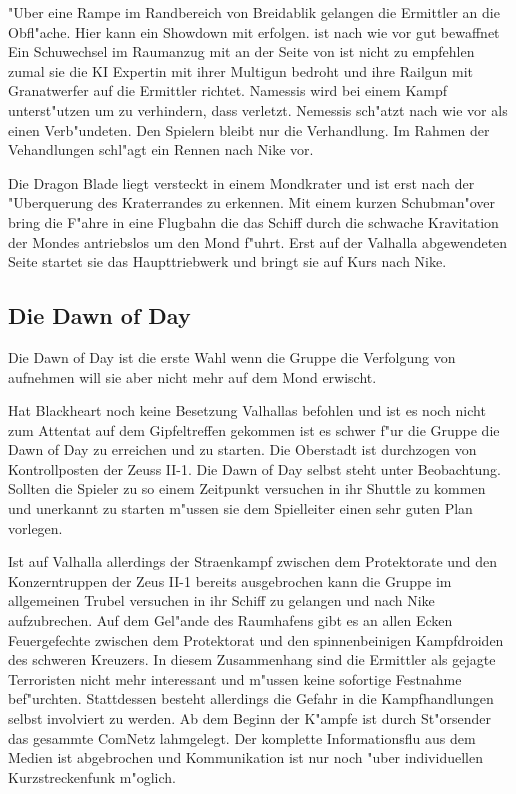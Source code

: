 "Uber eine Rampe im Randbereich von Breidablik gelangen die Ermittler an die Obfl"ache. Hier kann ein Showdown mit \xl{} erfolgen. \xl{} ist nach wie vor gut bewaffnet Ein Schu\3wechsel im Raumanzug mit \ml{} an der Seite von \xl{} ist nicht zu empfehlen zumal sie die KI Expertin mit ihrer Multigun bedroht und ihre Railgun mit Granatwerfer auf die Ermittler richtet. Namessis wird bei einem Kampf \xl{} unterst"utzen um zu verhindern, dass \ml{} verletzt. Nemessis sch"atzt \xl{} nach wie vor als einen Verb"undeten. Den Spielern bleibt nur die Verhandlung. Im Rahmen der Vehandlungen schl"agt \xl{} ein Rennen nach Nike vor.

Die Dragon Blade liegt versteckt in einem Mondkrater und ist erst nach der "Uberquerung des Kraterrandes zu erkennen. Mit einem kurzen Schubman"over bring \xl{} die F"ahre in eine Flugbahn die das Schiff durch die schwache Kravitation der Mondes antriebslos um den Mond f"uhrt. Erst auf der Valhalla abgewendeten Seite startet sie das Haupttriebwerk und bringt sie auf Kurs nach Nike. 

\subsection{Die Dawn of Day}
Die Dawn of Day ist die erste Wahl wenn die Gruppe die Verfolgung von \xl{} aufnehmen will sie aber nicht mehr auf dem Mond erwischt.

Hat Blackheart noch keine Besetzung Valhallas befohlen und ist es noch nicht zum Attentat auf dem Gipfeltreffen gekommen 
ist es schwer f"ur die Gruppe die Dawn of Day zu erreichen und zu starten. Die Oberstadt ist durchzogen von 
Kontrollposten der Zeuss II-1. Die Dawn of Day selbst steht unter Beobachtung. Sollten die Spieler zu 
so einem Zeitpunkt versuchen in ihr Shuttle zu kommen und unerkannt zu starten m"ussen sie dem Spielleiter einen sehr guten Plan vorlegen.

Ist auf Valhalla allerdings der Stra\3enkampf zwischen dem Protektorate und den Konzerntruppen der Zeus II-1 bereits 
ausgebrochen kann die Gruppe im allgemeinen Trubel versuchen in ihr Schiff zu gelangen und nach Nike aufzubrechen. 
Auf dem Gel"ande des Raumhafens gibt es an allen Ecken Feuergefechte zwischen dem Protektorat und den spinnenbeinigen 
Kampfdroiden des schweren Kreuzers. In diesem Zusammenhang sind die Ermittler als gejagte Terroristen nicht mehr 
interessant und  m"ussen keine sofortige  Festnahme bef"urchten. Stattdessen besteht allerdings die Gefahr in die Kampfhandlungen 
selbst involviert zu werden. Ab dem Beginn der K"ampfe ist durch St"orsender das gesammte ComNetz lahmgelegt. Der komplette
Informationsflu\3 aus dem Medien ist abgebrochen und Kommunikation ist nur noch "uber individuellen Kurzstreckenfunk
m"oglich.

